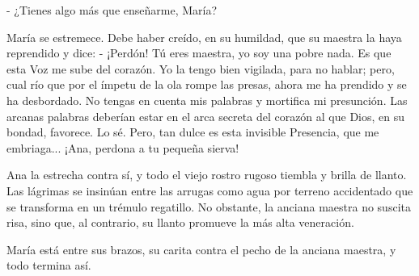 \documentclass[12pt]{book} %
\begin{document}
- ¿Tienes algo más que enseñarme, María? 

María se estremece. Debe haber creído, en su humildad, que su maestra la haya reprendido y dice: - ¡Perdón! Tú eres maestra, yo soy una pobre nada. Es que esta Voz me sube del corazón. Yo la tengo bien vigilada, para no hablar; pero, cual río que por el ímpetu de la ola rompe las presas, ahora me ha prendido y se ha desbordado. No tengas en cuenta mis palabras y mortifica mi presunción. Las arcanas palabras deberían estar en el arca secreta del corazón al que Dios, en su bondad, favorece. Lo sé. Pero, tan dulce es esta invisible Presencia, que me embriaga... ¡Ana, perdona a tu pequeña sierva! 

Ana la estrecha contra sí, y todo el viejo rostro rugoso tiembla y brilla de llanto. Las lágrimas se insinúan entre las arrugas como agua por terreno accidentado que se transforma en un trémulo regatillo. No obstante, la anciana maestra no suscita risa, sino que, al contrario, su llanto promueve la más alta veneración. 

María está entre sus brazos, su carita contra el pecho de la anciana maestra, y todo termina así. 
\end{document}
